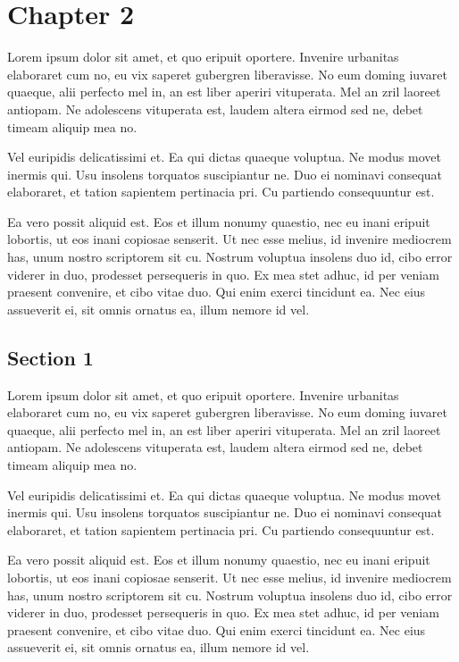 \chapter{Chapter 2}
\label{chapter:maintext1}

Lorem ipsum dolor sit amet, et quo eripuit oportere. Invenire urbanitas elaboraret cum no, eu vix saperet gubergren liberavisse. No eum doming iuvaret quaeque, alii perfecto mel in, an est liber aperiri vituperata. Mel an zril laoreet antiopam. Ne adolescens vituperata est, laudem altera eirmod sed ne, debet timeam aliquip mea no.

Vel euripidis delicatissimi et. Ea qui dictas quaeque voluptua. Ne modus movet inermis qui. Usu insolens torquatos suscipiantur ne. Duo ei nominavi consequat elaboraret, et tation sapientem pertinacia pri. Cu partiendo consequuntur est.

Ea vero possit aliquid est. Eos et illum nonumy quaestio, nec eu inani eripuit lobortis, ut eos inani copiosae senserit. Ut nec esse melius, id invenire mediocrem has, unum nostro scriptorem sit cu. Nostrum voluptua insolens duo id, cibo error viderer in duo, prodesset persequeris in quo. Ex mea stet adhuc, id per veniam praesent convenire, et cibo vitae duo. Qui enim exerci tincidunt ea. Nec eius assueverit ei, sit omnis ornatus ea, illum nemore id vel.

\section{Section 1}\label{section1}

Lorem ipsum dolor sit amet, et quo eripuit oportere. Invenire urbanitas elaboraret cum no, eu vix saperet gubergren liberavisse. No eum doming iuvaret quaeque, alii perfecto mel in, an est liber aperiri vituperata. Mel an zril laoreet antiopam. Ne adolescens vituperata est, laudem altera eirmod sed ne, debet timeam aliquip mea no.

Vel euripidis delicatissimi et. Ea qui dictas quaeque voluptua. Ne modus movet inermis qui. Usu insolens torquatos suscipiantur ne. Duo ei nominavi consequat elaboraret, et tation sapientem pertinacia pri. Cu partiendo consequuntur est.

Ea vero possit aliquid est. Eos et illum nonumy quaestio, nec eu inani eripuit lobortis, ut eos inani copiosae senserit. Ut nec esse melius, id invenire mediocrem has, unum nostro scriptorem sit cu. Nostrum voluptua insolens duo id, cibo error viderer in duo, prodesset persequeris in quo. Ex mea stet adhuc, id per veniam praesent convenire, et cibo vitae duo. Qui enim exerci tincidunt ea. Nec eius assueverit ei, sit omnis ornatus ea, illum nemore id vel.

